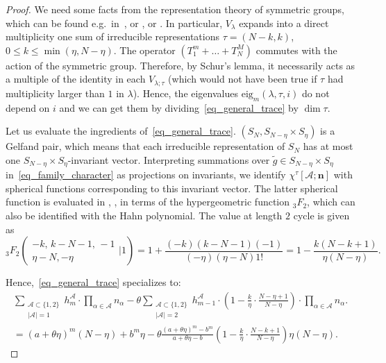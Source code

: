 \documentclass[11pt]{article}
\theoremstyle{definition}
\numberwithin{equation}{section}
\begin{document}
\begin{proof}
 We need some facts from the representation theory of symmetric groups, which can be found e.g.\ in~\cite{dunkl1978addition}, or \cite[Section 3]{Stanton1984}, or \cite[Sections 6.1, 6.2]{ceccherini2008harmonic}. In particular, $V_\lambda$ expands into a direct multiplicity one sum of irreducible representations $\tau=(N-k,k)$, $0\le k\le \min(\eta,N-\eta)$.
 The operator $(T_1^m+\dots+T_N^M)$ commutes with the action of the symmetric group. Therefore, by Schur's lemma, it necessarily acts as a multiple of the identity in each $V_{\lambda;\tau}$ (which would not have been true if $\tau$ had multiplicity larger than $1$ in $\lambda$). Hence, the eigenvalues $\mathrm{eig}_m(\lambda,\tau,i)$ do not depend on $i$ and we can get them by dividing~\eqref{eq_general_trace} by $\dim \tau$.

 Let us evaluate the ingredients of~\eqref{eq_general_trace}. $(S_N,S_{N-\eta}\times S_\eta)$ is a Gelfand pair, which means that each irreducible representation of $S_N$ has at most one $S_{N-\eta}\times S_\eta$-invariant vector. Interpreting summations over $\tilde g \in S_{N-\eta}\times S_\eta$ in~\eqref{eq_family_character} as projections on invariants, we identify $ \chi^\tau[\mathcal A; \mathbf n]$ with spherical functions corresponding to this invariant vector. The latter spherical function is evaluated in \cite[Corollary 2.2]{dunkl1978addition}, \cite[(3.15)]{Stanton1984},  \cite[Theorems 6.1.10, 6.2.3]{ceccherini2008harmonic} in terms of the hypergeometric function $_3F_2$, which can also be identified with the Hahn polynomial. The value at length $2$ cycle is given as
 \begin{equation}
  _3 F_2\left( \begin{smallmatrix}-k,\, k-N-1,\, -1 \\ \eta-N, -\eta  \end{smallmatrix} \Bigr|  1 \right)=1 + \frac{(-k) (k-N-1) (-1)}{(-\eta)(\eta-N) 1!}=1-\frac{k(N-k+1)}{\eta(N-\eta)}.
 \end{equation}

Hence,~\eqref{eq_general_trace} specializes to:
\begin{multline*}
   \sum_{\begin{smallmatrix}\mathcal A\subset \{1,2\}\\ |\mathcal A|=1\end{smallmatrix}}  h^{\mathcal A}_{m}  \cdot \prod_{\alpha\in \mathcal A} n_\alpha
 -\theta \sum_{\begin{smallmatrix}\mathcal A\subset \{1,2\}\\ |\mathcal A|=2\end{smallmatrix}}  h^{\mathcal A}_{m-1} \cdot  \left(1-\frac{k}{\eta}\cdot \frac{N-\eta+1}{N-\eta }\right)\cdot \prod_{\alpha\in \mathcal A} n_\alpha.
 \\=(a+\theta \eta)^m (N-\eta) + b^m \eta-\theta \frac{(a+\theta \eta)^m- b^m}{a+\theta \eta -b}  \left(1-\frac{k}{\eta}\cdot \frac{N-k+1}{N-\eta }\right) \eta (N-\eta).
 \end{multline*}
\end{proof}
\end{document}
